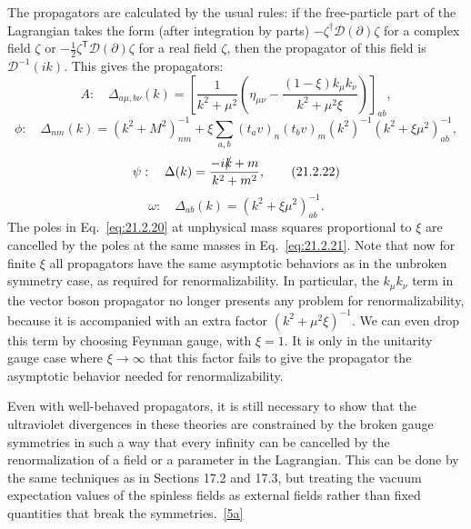 The propagators are calculated by the usual rules: if the free-particle
part of the Lagrangian takes the form (after integration by parts)
$-\zeta^\dagger\mathcal D(\partial)\zeta$ for a complex field $\zeta$ or
$-\frac12\zeta^{\mathsf T}\mathcal D(\partial)\zeta$ for a real field $\zeta$, then
the propagator of this field is $\mathcal D^{-1}(ik)$. This gives the
propagators:
\begin{equation}
 A:\quad
 \Delta_{a\mu,b\nu}(k)
 =\left[
 \frac1{k^2+\mu^2}
 \left(\eta_{\mu\nu}
 -\frac{(1-\xi)k_\mu k_\nu}{k^2+\mu^2\xi}\right)
 \right]_{ab},
 \tag{21.2.20}\label{eq:21.2.20}
\end{equation}
\begin{equation}
 \phi:\quad
 \Delta_{nm}(k)
 =(k^2+M^2)^{-1}_{nm}
 +\xi\sum_{a,b}
 (t_a v)_n(t_b v)_m
 (k^2)^{-1}(k^2+\xi\mu^2)^{-1}_{ab},
 \tag{21.2.21}\label{eq:21.2.21}
\end{equation}
\begin{equation}
 \psi:\quad
 \Delta(k)=\frac{-i\sl{k}+m}{k^2+m^2},
 \tag{21.2.22}\label{eq:21.2.22}
\end{equation}
\begin{equation}
 \omega:\quad
 \Delta_{ab}(k)
 =(k^2+\xi\mu^2)^{-1}_{ab}.
 \tag{21.2.23}\label{eq:21.2.23}
\end{equation}
The poles in Eq.~\eqref{eq:21.2.20} at unphysical mass squares proportional
to $\xi$ are cancelled by the poles at the same masses in
Eq.~\eqref{eq:21.2.21}. Note that now for finite $\xi$ all propagators have
the same asymptotic behaviors as in the unbroken symmetry case, as required
for renormalizability. In particular, the $k_\mu k_\nu$ term in the vector
boson propagator no longer presents any problem for renormalizability,
because it is accompanied with an extra factor
$(k^2+\mu^2\xi)^{-1}$. We can even drop this term by choosing Feynman
gauge, with $\xi=1$. It is only in the unitarity gauge case where
$\xi\to\infty$ that this factor fails to give the propagator the asymptotic
behavior needed for renormalizability.

Even with well-behaved propagators, it is still necessary to show that the
ultraviolet divergences in these theories are constrained by the broken
gauge symmetries in such a way that every infinity can be cancelled by the
renormalization of a field or a parameter in the Lagrangian. This can be
done by the same techniques as in Sections 17.2 and 17.3, but treating the
vacuum expectation values of the spinless fields as external fields rather
than fixed quantities that break the
symmetries.~\hyperref[ch21-ref-5a]{[5a]}
